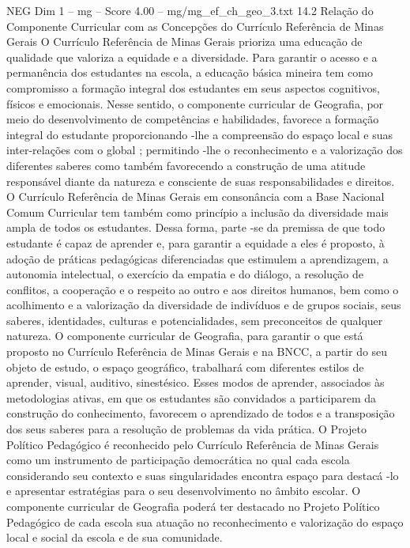 \begin{textsample}{NEG Dim 1 – mg – Score 4.00 – mg/mg\_ef\_ch\_geo\_3.txt}  \label{ex:f1_neg_059}
14.2 Relação do Componente Curricular com as Concepções do Currículo Referência de Minas Gerais O Currículo Referência de Minas Gerais prioriza uma educação de qualidade que valoriza a equidade e a diversidade.
Para garantir o acesso e a permanência dos estudantes na escola, a educação básica mineira tem como compromisso a formação integral dos estudantes em seus aspectos cognitivos, físicos e emocionais.
Nesse sentido, o componente curricular de Geografia, por meio do desenvolvimento de competências e habilidades, favorece a formação integral do estudante proporcionando -lhe a compreensão do espaço local e suas inter-relações com o global ; permitindo -lhe o reconhecimento e a valorização dos diferentes saberes como também favorecendo a construção de uma atitude responsável diante da natureza e consciente de suas responsabilidades e direitos.
O Currículo Referência de Minas Gerais em consonância com a Base Nacional Comum Curricular tem também como princípio a inclusão da diversidade mais ampla de todos os estudantes.
Dessa forma, parte -se da premissa de que todo estudante é capaz de aprender e, para garantir a equidade a eles é proposto, à adoção de práticas pedagógicas diferenciadas que estimulem a aprendizagem, a autonomia intelectual, o exercício da empatia e do diálogo, a resolução de conflitos, a cooperação e o respeito ao outro e aos direitos humanos, bem como o acolhimento e a valorização da diversidade de indivíduos e de grupos sociais, seus saberes, identidades, culturas e potencialidades, sem preconceitos de qualquer natureza.
O componente curricular de Geografia, para garantir o que está proposto no Currículo Referência de Minas Gerais e na BNCC, a partir do seu objeto de estudo, o espaço geográfico, trabalhará com diferentes estilos de aprender, visual, auditivo, sinestésico.
Esses modos de aprender, associados às metodologias ativas, em que os estudantes são convidados a participarem da construção do conhecimento, favorecem o aprendizado de todos e a transposição dos seus saberes para a resolução de problemas da vida prática.
O Projeto Político Pedagógico é reconhecido pelo Currículo Referência de Minas Gerais como um instrumento de participação democrática no qual cada escola considerando seu contexto e suas singularidades encontra espaço para destacá -lo e apresentar estratégias para o seu desenvolvimento no âmbito escolar.
O componente curricular de Geografia poderá ter destacado no Projeto Político Pedagógico de cada escola sua atuação no reconhecimento e valorização do espaço local e social da escola e de sua comunidade.

\end{textsample}
